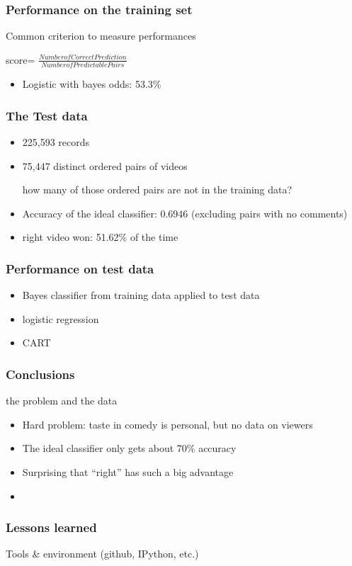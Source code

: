 \documentclass[fleqn]{beamer}
\begin{document}

\begin{frame}
\frametitle{Performance on the training set}

    \begin{beamerboxesrounded}{Common criterion to measure performances}

     score= $\frac{Number of Correct Prediction}{Number of Predictable Pairs}$
     \end{beamerboxesrounded}
    \begin{itemize}
          \item Logistic with bayes odds: 53.3\%
    \end{itemize}
\end{frame}

\begin{frame}
\frametitle{The Test data}
    \begin{itemize}
        \item 225,593 records
        \item 75,447 distinct ordered pairs of videos
        \item [how many of those ordered pairs are not in the training data?]
        \item Accuracy of the ideal classifier: 0.6946 (excluding pairs with no comments)
        \item right video won: 51.62\% of the time
    \end{itemize}

\end{frame}

\begin{frame}
\frametitle{Performance on test data}
    \begin{itemize}
        \item Bayes classifier from training data applied to test data
        \item logistic regression
        \item CART
    \end{itemize}

\end{frame}

\begin{frame}
\frametitle{Conclusions}
    the problem and the data
    \begin{itemize}
        \item Hard problem: taste in comedy is personal, but no data on viewers
        \item The ideal classifier only gets about 70\% accuracy
        \item Surprising that ``right'' has such a big advantage
        \item 
     \end{itemize}
\end{frame}

\begin{frame}
\frametitle{Lessons learned}
   Tools \& environment (github, IPython, etc.)


\end{frame}
\end{document}
